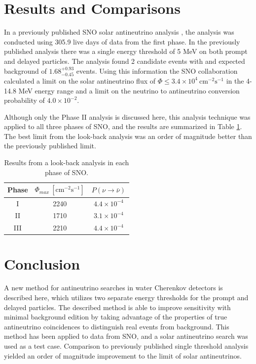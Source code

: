 \documentclass[preprint,12pt]{elsarticle}
\begin{document}
\section{Results and Comparisons}
\label{sec:results}  
In a previously published SNO solar antineutrino analysis \cite{snoantinu}, the analysis was conducted using 305.9 live days of data from the first phase.  In the previously published analysis there was a single energy threshold of 5 MeV on both prompt and delayed particles.  The analysis found 2 candidate events with and expected background of $1.68^{+0.93}_{-0.45}$ events.  Using this information the SNO collaboration calculated a limit on the solar antineutrino flux of $\Phi \le 3.4\times10^4 \mathrm{\ cm^{-2}s^{-1}}$ in the 4-14.8 MeV energy range and a limit on the neutrino to antineutrino conversion probability of $4.0\times 10^{-2}$. 

Although only the Phase II analysis is discussed here, this analysis technique was applied to  all three phases of SNO, and the results are summarized in Table \ref{tab:results}.  The best limit from the look-back analysis was an order of magnitude better than the previously published limit. 

\begin{table}[htbp]
   \centering
   \begin{tabular}{ccc} %

      Phase & $\Phi_{max}\mathrm{\ [cm^{-2}s^{-1}]}$ & $P(\nu\rightarrow\bar{\nu})$\\
\hline
	I & 2240 &$4.4\times10^{-4}$ \\
	II & 1710 & $3.1\times10^{-4}$\\
	III & 2210&$4.4\times10^{-4}$ \\
\hline
   \end{tabular}
   \caption{Results from a look-back analysis in each phase of SNO.}
   \label{tab:results}
\end{table}
\section{Conclusion}
\label{sec:conclusion}   

A new method for antineutrino searches in water Cherenkov detectors is described here, which utilizes two separate energy thresholds for the prompt and delayed particles. The described method is able to improve sensitivity with minimal background edition by taking advantage of the properties of true antineutrino coincidences to distinguish real events from background.  This method has been applied to data from SNO, and a solar antineutrino search was used as a test case.  Comparison to previously published single threshold analysis yielded an order of magnitude improvement to the limit of solar antineutrinos. 
\end{document}
